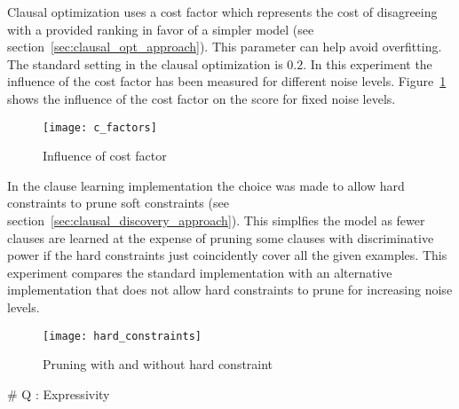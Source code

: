 
\begin{experiment}
	
	Clausal optimization uses a cost factor which represents the cost of disagreeing with a provided ranking in favor of a simpler model (see section~\ref{sec:clausal_opt_approach}).
	This parameter can help avoid overfitting.
	The standard setting in the clausal optimization is $0.2$.
	In this experiment the influence of the cost factor has been measured for different noise levels.
	Figure~\ref{fig:c_factors} shows the influence of the cost factor on the score for fixed noise levels.

	\begin{figure}

		\caption{Influence of cost factor}
		\centering
			\texttt{[image: c\_factors]}
		\label{fig:c_factors}

	\end{figure}

\end{experiment}

\begin{experiment}
	
	In the clause learning implementation the choice was made to allow hard constraints to prune soft constraints (see section~\ref{sec:clausal_discovery_approach}).
	This simplfies the model as fewer clauses are learned at the expense of pruning some clauses with discriminative power if the hard constraints just coincidently cover all the given examples.
	This experiment compares the standard implementation with an alternative implementation that does not allow hard constraints to prune for increasing noise levels.

	\begin{figure}

		\caption{Pruning with and without hard constraint}
		\centering
			\texttt{[image: hard\_constraints]}
		\label{fig:hard_constraints}

	\end{figure}

\end{experiment}


\# Q : Expressivity

